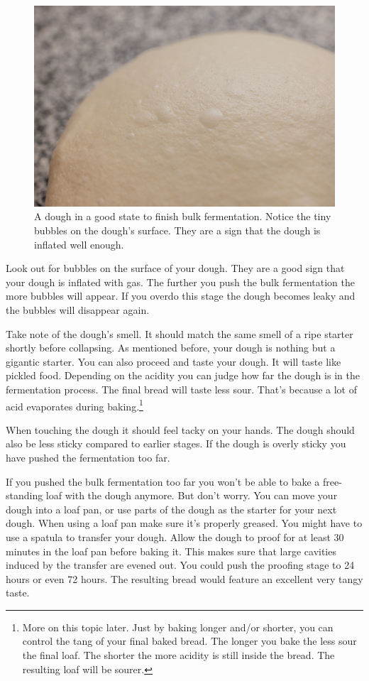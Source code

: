 \begin{figure}[!htb]
  \includegraphics[width=\textwidth]{bulk-finished-dough}
  \caption{A dough in a good state to finish bulk fermentation. Notice
  the tiny bubbles on the dough's surface. They are a sign that the dough
  is inflated well enough.}
\end{figure}

Look out for bubbles on the surface of your dough. They
are a good sign that your dough is inflated with gas. The
further you push the bulk fermentation the more bubbles
will appear. If you overdo this stage the dough becomes leaky and
the bubbles will disappear again.

Take note of the dough's smell. It should match the same
smell of a ripe starter shortly before collapsing. As mentioned
before, your dough is nothing but a gigantic starter. You
can also proceed and taste your dough. It will taste like
pickled food. Depending on the acidity you can judge how
far the dough is in the fermentation process. The final bread
will taste less sour. That's because a lot of acid evaporates
during baking.\footnote{More on this topic later.
Just by baking longer and/or shorter, you can control
the tang of your final baked bread. The longer
you bake the less sour the final loaf. The shorter
the more acidity is still inside the bread. The resulting
loaf will be sourer.}

When touching the dough it should feel tacky
on your hands. The dough should also be less sticky
compared to earlier stages. If the dough is overly
sticky you have pushed the fermentation too far.

If you pushed the bulk fermentation too far you won't be able
to bake a free-standing loaf with the dough anymore. But don't
worry. You can move your dough into a loaf pan, or use parts
of the dough as the starter for your next dough. When using
a loaf pan make sure it's properly greased. You might have
to use a spatula to transfer your dough. Allow the dough
to proof for at least 30 minutes in the loaf pan before
baking it. This makes sure that large cavities induced
by the transfer are evened out. You could push the proofing
stage to 24 hours or even 72 hours. The resulting
bread would feature an excellent very tangy taste.


